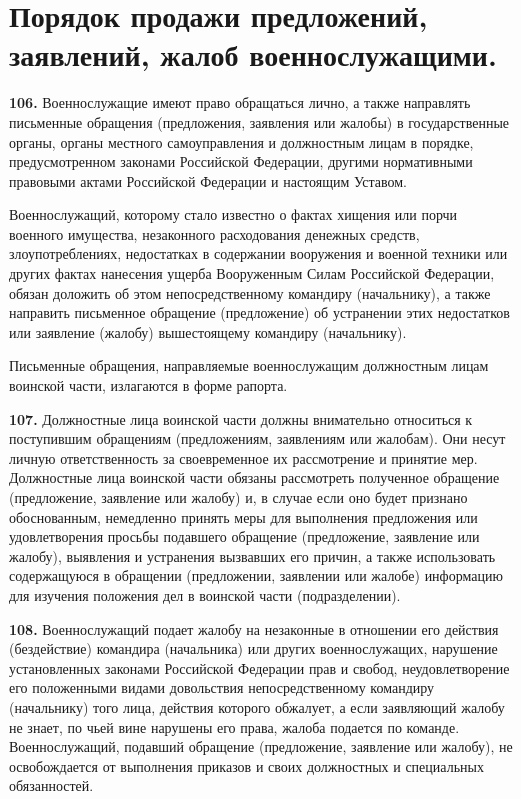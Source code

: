\documentclass[12pt,a4paper]{report}
\begin{document}
\section{Порядок продажи предложений, заявлений, жалоб военнослужащими.}
\textbf{106.} Военнослужащие имеют право обращаться лично, а также направлять письменные обращения (предложения, заявления или жалобы) в государственные органы, органы местного самоуправления и должностным лицам в порядке, предусмотренном законами Российской Федерации, другими нормативными правовыми актами Российской Федерации и настоящим Уставом.

Военнослужащий, которому стало известно о фактах хищения или порчи военного имущества, незаконного расходования денежных средств, злоупотреблениях, недостатках в содержании вооружения и военной техники или других фактах нанесения ущерба Вооруженным Силам Российской Федерации, обязан доложить об этом непосредственному командиру (начальнику), а также направить письменное обращение (предложение) об устранении этих недостатков или заявление (жалобу) вышестоящему командиру (начальнику).

Письменные обращения, направляемые военнослужащим должностным лицам воинской части, излагаются в форме рапорта.



\textbf{107.} Должностные лица воинской части должны внимательно относиться к поступившим обращениям (предложениям, заявлениям или жалобам). Они несут личную ответственность за своевременное их рассмотрение и принятие мер.
Должностные лица воинской части обязаны рассмотреть полученное обращение (предложение, заявление или жалобу) и, в случае если оно будет признано обоснованным, немедленно принять меры для выполнения предложения или удовлетворения просьбы подавшего обращение (предложение, заявление или жалобу), выявления и устранения вызвавших его причин, а также использовать содержащуюся в обращении (предложении, заявлении или жалобе) информацию для изучения положения дел в воинской части (подразделении).



\textbf{108. }Военнослужащий подает жалобу на незаконные в отношении его действия (бездействие) командира (начальника) или других военнослужащих, нарушение установленных законами Российской Федерации прав и свобод, неудовлетворение его положенными видами довольствия непосредственному командиру (начальнику) того лица, действия которого обжалует, а если заявляющий жалобу не знает, по чьей вине нарушены его права, жалоба подается по команде.
Военнослужащий, подавший обращение (предложение, заявление или жалобу), не освобождается от выполнения приказов и своих должностных и специальных обязанностей.
\end{document}
